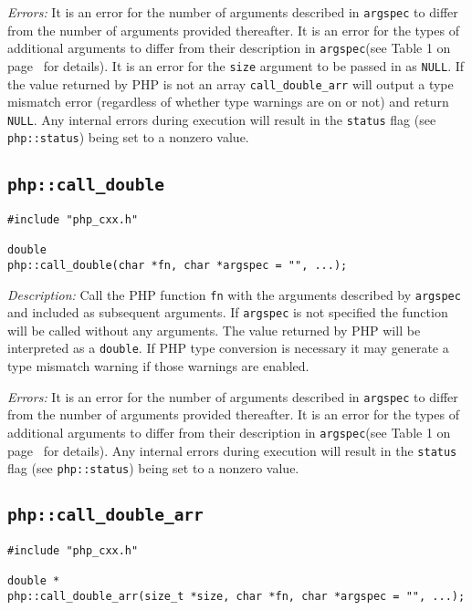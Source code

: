 \documentclass[11pt,titlepage]{article}
\begin{document}
\emph{Errors:} It is an error for the number of arguments described in \verb|argspec| to differ from the number of arguments provided thereafter. It is an error for the types of additional arguments to differ from their description in \verb|argspec|(see Table 1 on page~\pageref{Table1} for details). It is an error for the \verb|size| argument to be passed in as \verb|NULL|. If the value returned by PHP is not an array \verb|call_double_arr| will output a type mismatch error (regardless of whether type warnings are on or not) and return \verb|NULL|. Any internal errors during execution will result in the \verb|status| flag (see \verb|php::status|) being set to a nonzero value.

\subsection{\texttt{php::call\_double}}

\begin{verbatim}
#include "php_cxx.h"

double 
php::call_double(char *fn, char *argspec = "", ...);
\end{verbatim}

\emph{Description:} Call the PHP function \verb|fn| with the arguments described by \verb|argspec| and included as subsequent arguments. If \verb|argspec| is not specified the function will be called without any arguments. The value returned by PHP will be interpreted as a \verb|double|. If PHP type conversion is necessary it may generate a type mismatch warning if those warnings are enabled.

\emph{Errors:} It is an error for the number of arguments described in \verb|argspec| to differ from the number of arguments provided thereafter. It is an error for the types of additional arguments to differ from their description in \verb|argspec|(see Table 1 on page~\pageref{Table1} for details). Any internal errors during execution will result in the \verb|status| flag (see \verb|php::status|) being set to a nonzero value.


\subsection{\texttt{php::call\_double\_arr}}

\begin{verbatim}
#include "php_cxx.h"

double *
php::call_double_arr(size_t *size, char *fn, char *argspec = "", ...);
\end{verbatim}
\end{document}
